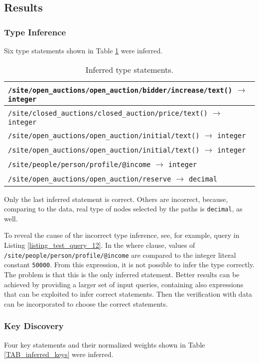 \subsection{Results}

\subsubsection{Type Inference}
Six type statements shown in Table \ref{TAB_inferred_types} were inferred.

\begin{table}
\begin{tabular}{|l|}
\hline
\texttt{/site/open\_auctions/open\_auction/bidder/increase/text()} $\rightarrow$ \texttt{integer} \\ \hline
\texttt{/site/closed\_auctions/closed\_auction/price/text()} $\rightarrow$ \texttt{integer} \\ \hline
\texttt{/site/open\_auctions/open\_auction/initial/text()} $\rightarrow$ \texttt{integer} \\ \hline
\texttt{/site/open\_auctions/open\_auction/initial/text()} $\rightarrow$ \texttt{integer} \\ \hline
\texttt{/site/people/person/profile/@income} $\rightarrow$ \texttt{integer} \\ \hline
\texttt{/site/open\_auctions/open\_auction/reserve} $\rightarrow$ \texttt{decimal} \\ \hline
\end{tabular}
\caption{Inferred type statements.}
\label{TAB_inferred_types}
\end{table}

Only the last inferred statement is correct. Others are incorrect, because, comparing to the data, real type of nodes selected by the paths is \texttt{decimal}, as well.

To reveal the cause of the incorrect type inference, see, for example, query in Listing \ref{listing_test_query_12}. In the where clause, values of \texttt{/site/people/person/profile/\-@income} are compared to the integer literal constant \texttt{50000}. From this expression, it is not possible to infer the type correctly. The problem is that this is the only inferred statement. Better results can be achieved by providing a larger set of input queries, containing also expressions that can be exploited to infer correct statements. Then the verification with data can be incorporated to choose the correct statements.

\subsubsection{Key Discovery}
Four key statements and their normalized weights shown in Table \ref{TAB_inferred_keys} were inferred.

